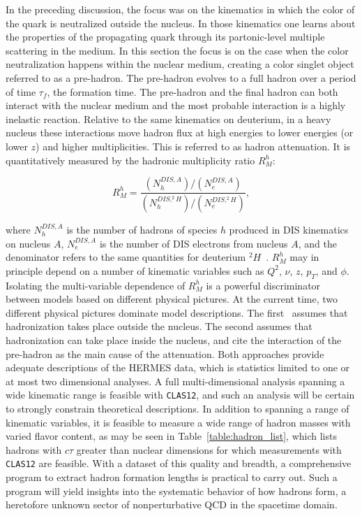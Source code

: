 In the preceding discussion, the focus was on the kinematics in which the 
color of the quark is neutralized outside the nucleus.  In those kinematics 
one learns about the properties of the propagating quark through its 
partonic-level multiple scattering in the medium. In this section the focus 
is on the case when the color neutralization happens within the nuclear 
medium, creating a color singlet object referred to as a pre-hadron. The 
pre-hadron evolves to a full hadron over a period of time $\tau_f$, the 
formation time.  The pre-hadron and the final hadron can both interact with 
the nuclear medium and the most probable interaction is a highly inelastic 
reaction. Relative to the same kinematics on deuterium, in a heavy nucleus 
these interactions move hadron flux at high energies to lower energies (or
lower $z$) and higher multiplicities. This is referred to as hadron 
attenuation. It is quantitatively measured by the hadronic multiplicity 
ratio $R_M^h$:
    
\begin{equation}
R_M^h = \frac{(N_h^{DIS,A})/(N_e^{DIS,A})}
{(N_h^{DIS,^2H})/(N_e^{DIS,^2H})},
\end{equation}

\noindent
where $N_h^{DIS,A}$ is the number of hadrons of species $h$ produced
in DIS kinematics on nucleus $A$, $N_e^{DIS,A}$ is the number of DIS
electrons from nucleus $A$, and the denominator refers to the same
quantities for deuterium $^2H$~\cite{HERMES}. $R_M^h$ may in principle
depend on a number of kinematic variables such as $Q^2$, $\nu$, $z$,
$p_T$, and $\phi$. Isolating the multi-variable dependence of $R_M^h$
is a powerful discriminator between models based on different physical
pictures. At the current time, two different physical pictures
dominate model descriptions. The first~\cite{WANG,ARLEO} assumes that 
hadronization takes place outside the nucleus. The second
\cite{KNPH,MOSEL} assumes that hadronization can take place inside the 
nucleus, and cite the interaction of the pre-hadron as the main cause of 
the attenuation.  Both approaches provide adequate descriptions of the 
HERMES data, which is statistics limited to one or at most two dimensional
analyses. A full multi-dimensional analysis spanning a wide kinematic
range is feasible with {\tt CLAS12}, and such an analysis will be certain 
to strongly constrain theoretical descriptions. In addition to spanning a
range of kinematic variables, it is feasible to measure a wide range
of hadron masses with varied flavor content, as may be seen in
Table~\ref{table:hadron_list}, which lists hadrons with $c\tau$ greater
than nuclear dimensions for which measurements with {\tt CLAS12} are
feasible. With a dataset of this quality and breadth, a comprehensive
program to extract hadron formation lengths is practical to carry
out. Such a program will yield insights into the systematic behavior
of how hadrons form, a heretofore unknown sector of nonperturbative
QCD in the spacetime domain.  


